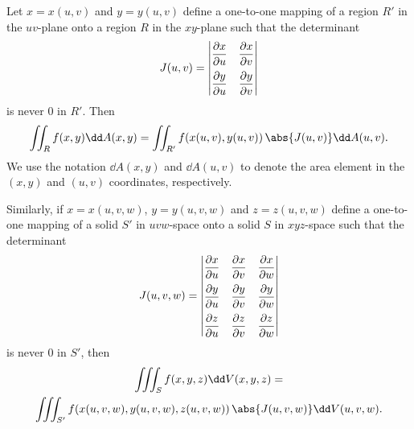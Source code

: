 {
\begin{theorem}\label{thm:changevarint}
Let $x=x(u,v)$ and $y=y(u,v)$ define a one-to-one mapping of a region $R'$ in the $uv$-plane onto a region $R$ in the $xy$-plane such that the determinant
  \begin{equation}\label{eqn:jacob2}
   J(u,v) =
    \begin{vmatrix}
     \dfrac{\partial x}{\partial u} & \dfrac{\partial x}{\partial v}\vspace{2mm}\\
     \dfrac{\partial y}{\partial u} & \dfrac{\partial y}{\partial v}
    \end{vmatrix}
  \end{equation}
  is never $0$ in $R'$. Then
  \begin{equation}\label{eqn:changevarint2}
   \iint_{R} f(x,y)\dd A(x,y)
   = \iint_{R'} f(x(u,v),y(u,v))\,\abs{J(u,v)}\dd A(u,v) .
  \end{equation}
  We use the notation $\dd A(x,y)$ and $\dd A(u,v)$ to denote the area element in the $(x,y)$ and $(u,v)$ coordinates, respectively.

  Similarly, if $x=x(u,v,w)$, $y=y(u,v,w)$ and $z=z(u,v,w)$ define a one-to-one mapping of a solid $S'$ in $uvw$-space onto a solid $S$ in $xyz$-space such that the determinant
  \begin{equation}\label{eqn:jacob3}
   J(u,v,w) =
    \begin{vmatrix}
     \dfrac{\partial x}{\partial u} & \dfrac{\partial x}{\partial v} & \dfrac{\partial x}{\partial w}\vspace{2mm}\\
     \dfrac{\partial y}{\partial u} & \dfrac{\partial y}{\partial v} & \dfrac{\partial y}{\partial w}\vspace{2mm}\\
     \dfrac{\partial z}{\partial u} & \dfrac{\partial z}{\partial v} & \dfrac{\partial z}{\partial w}
    \end{vmatrix}
  \end{equation}
  is never $0$ in $S'$, then
  \begin{multline}\label{eqn:changevarint3}
   \iiint_{S} f(x,y,z)\dd V(x,y,z) =\\
   \iiint_{S'} f(x(u,v,w),y(u,v,w),z(u,v,w))\,\abs{J(u,v,w)}\dd V(u,v,w).
  \end{multline}
\end{theorem}}

